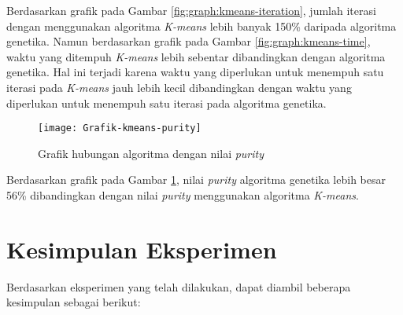 Berdasarkan grafik pada Gambar \ref{fig:graph:kmeans-iteration}, jumlah iterasi dengan menggunakan algoritma \textit{K-means} lebih banyak 150\% daripada algoritma genetika. Namun berdasarkan grafik pada Gambar \ref{fig:graph:kmeans-time}, waktu yang ditempuh \textit{K-means} lebih sebentar dibandingkan dengan algoritma genetika. Hal ini terjadi karena waktu yang diperlukan untuk menempuh satu iterasi pada \textit{K-means} jauh lebih kecil dibandingkan dengan waktu yang diperlukan untuk menempuh satu iterasi pada algoritma genetika.

\begin{figure}[H]
	\centering
	\texttt{[image: Grafik-kmeans-purity]}
	\caption{Grafik hubungan algoritma dengan nilai \textit{purity}}
	\label{fig:graph:kmeans-purity}
\end{figure}

Berdasarkan grafik pada Gambar \ref{fig:graph:kmeans-purity}, nilai \textit{purity} algoritma genetika lebih besar 56\% dibandingkan dengan nilai \textit{purity} menggunakan algoritma \textit{K-means}.

\section{Kesimpulan Eksperimen}
Berdasarkan eksperimen yang telah dilakukan, dapat diambil beberapa kesimpulan sebagai berikut:

